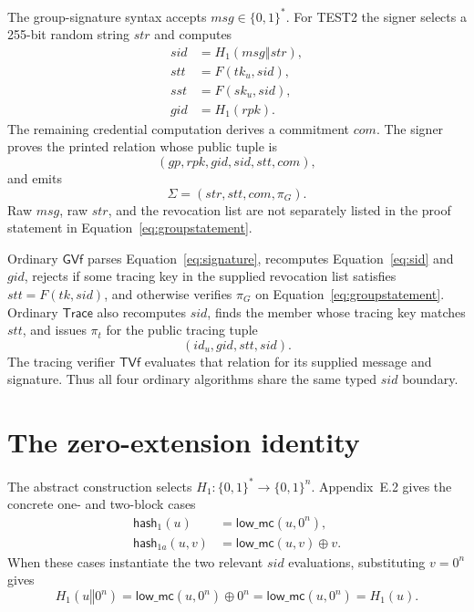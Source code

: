 \documentclass[10pt,a4paper]{article}
\newcommand{\bits}{\{0,1\}}
\newcommand{\Hone}{H_1}
\newcommand{\sid}{\mathit{sid}}
\newcommand{\strr}{\mathit{str}}
\newcommand{\stt}{\mathit{stt}}
\newcommand{\com}{\mathit{com}}
\newcommand{\msg}{\mathit{msg}}
\newcommand{\GVf}{\mathsf{GVf}}
\newcommand{\Trace}{\mathsf{Trace}}
\newcommand{\TVf}{\mathsf{TVf}}
\begin{document}
The group-signature syntax accepts $\msg\in\bits^*$. For TEST2 the signer
selects a 255-bit random string $\strr$ and computes
\begin{align}
\sid &= \Hone(\msg\mathbin\Vert\strr),\label{eq:sid}\\
\stt &= F(\mathit{tk}_u,\sid),\\
\mathit{sst} &= F(\mathit{sk}_u,\sid),\\
\mathit{gid} &= \Hone(\mathit{rpk}).
\end{align}
The remaining credential computation derives a commitment $\com$. The signer
proves the printed relation whose public tuple is
\begin{equation}
(\mathit{gp},\mathit{rpk},\mathit{gid},\sid,\stt,\com),
\label{eq:groupstatement}
\end{equation}
and emits
\begin{equation}
\Sigma=(\strr,\stt,\com,\pi_G).
\label{eq:signature}
\end{equation}
Raw $\msg$, raw $\strr$, and the revocation list are not separately listed in
the proof statement in Equation~\eqref{eq:groupstatement}.

Ordinary $\GVf$ parses Equation~\eqref{eq:signature}, recomputes
Equation~\eqref{eq:sid} and $\mathit{gid}$, rejects if some tracing key in the
supplied revocation list satisfies $\stt=F(\mathit{tk},\sid)$, and otherwise
verifies $\pi_G$ on Equation~\eqref{eq:groupstatement}. Ordinary $\Trace$
also recomputes $\sid$, finds the member whose tracing key matches $\stt$, and
issues $\pi_t$ for the public tracing tuple
\begin{equation}
(\mathit{id}_u,\mathit{gid},\stt,\sid).
\label{eq:tracestatement}
\end{equation}
The tracing verifier $\TVf$ evaluates that relation for its supplied message
and signature. Thus all four ordinary algorithms share the same typed $\sid$
boundary.

\section{The zero-extension identity}

The abstract construction selects
$\Hone:\bits^*\rightarrow\bits^n$. Appendix~E.2 gives the concrete one- and
two-block cases
\begin{align}
\mathsf{hash}_1(u)
  &=\mathsf{low\_mc}(u,0^n),\label{eq:oneblock}\\
\mathsf{hash}_{1a}(u,v)
  &=\mathsf{low\_mc}(u,v)\oplus v.\label{eq:twoblock}
\end{align}
When these cases instantiate the two relevant $\sid$ evaluations, substituting
$v=0^n$ gives
\begin{equation}
\Hone(u\mathbin\Vert0^n)
=\mathsf{low\_mc}(u,0^n)\oplus0^n
=\mathsf{low\_mc}(u,0^n)
=\Hone(u).
\label{eq:zeroextension}
\end{equation}
\end{document}
